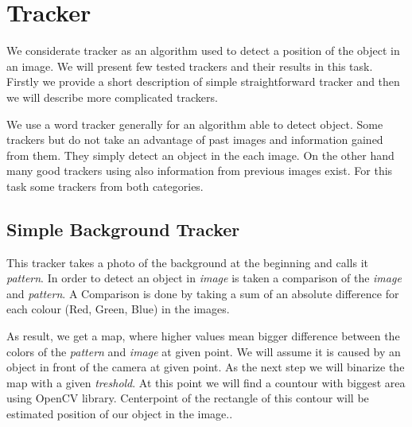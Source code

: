 \chapter{Tracker}

We considerate tracker as an algorithm used to detect a position of the object in
an image. We will present few tested trackers and their results in this task.
Firstly we provide a short description of simple straightforward tracker and
then we will describe more complicated trackers.

We use a word tracker generally for an algorithm able to detect object. Some
trackers but do not take an advantage of past images and information gained
from them. They simply detect an object in the each image. On the other hand
many good trackers using also information from previous images exist. For this
task some trackers from both categories.


\section{Simple Background Tracker}

This tracker takes a photo of the background at the beginning and calls it
\emph{pattern}. In order to detect an object in \emph{image} is taken a
comparison of the \emph{image} and \emph{pattern}. A Comparison is done by
taking a sum of an absolute difference for each colour (Red, Green, Blue) in
the images. 

As result, we get a map, where higher values mean bigger difference between the
colors of the \emph{pattern} and \emph{image} at given point. We will assume it
is caused by an object in front of the camera at given point.  As the next step
we will binarize the map with a given \emph{treshold}. At this point we will
find a countour with biggest area using OpenCV library. Centerpoint of the
rectangle of this contour will be estimated position of our object in the
image..




